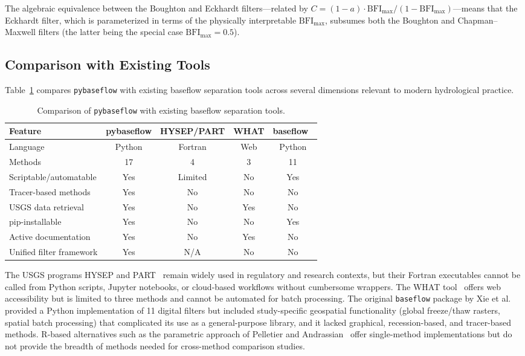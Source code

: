 \documentclass[hydrology,article,submit,pdftex,moreauthors]{Definitions/mdpi}
\begin{document}
The algebraic equivalence between the Boughton and Eckhardt filters---related by $C = (1-a)\cdot\mathrm{BFI_{max}}/(1-\mathrm{BFI_{max}})$---means that the Eckhardt filter, which is parameterized in terms of the physically interpretable $\mathrm{BFI_{max}}$, subsumes both the Boughton and Chapman--Maxwell filters (the latter being the special case $\mathrm{BFI_{max}} = 0.5$).

\subsection{Comparison with Existing Tools}
\label{sec:comparison_tools}

Table~\ref{tab:comparison} compares \texttt{pybaseflow} with existing baseflow separation tools across several dimensions relevant to modern hydrological practice.

\begin{table}[H]
\caption{Comparison of \texttt{pybaseflow} with existing baseflow separation tools.\label{tab:comparison}}
\small
\begin{tabularx}{\textwidth}{lcccc}
\toprule
\textbf{Feature} & \textbf{pybaseflow} & \textbf{HYSEP/PART} & \textbf{WHAT} & \textbf{baseflow}~\cite{Xie2020} \\
\midrule
Language & Python & Fortran & Web & Python \\
Methods & 17 & 4 & 3 & 11 \\
Scriptable/automatable & Yes & Limited & No & Yes \\
Tracer-based methods & Yes & No & No & No \\
USGS data retrieval & Yes & No & Yes & No \\
pip-installable & Yes & No & No & Yes \\
Active documentation & Yes & No & Yes & No \\
Unified filter framework & Yes & N/A & No & No \\
\bottomrule
\end{tabularx}
\end{table}

The USGS programs HYSEP and PART~\cite{Sloto1996,Rutledge1998} remain widely used in regulatory and research contexts, but their Fortran executables cannot be called from Python scripts, Jupyter notebooks, or cloud-based workflows without cumbersome wrappers. The WHAT tool~\cite{Lim2005} offers web accessibility but is limited to three methods and cannot be automated for batch processing. The original \texttt{baseflow} package by Xie et al.~\cite{Xie2020} provided a Python implementation of 11 digital filters but included study-specific geospatial functionality (global freeze/thaw rasters, spatial batch processing) that complicated its use as a general-purpose library, and it lacked graphical, recession-based, and tracer-based methods. R-based alternatives such as the parametric approach of Pelletier and Andrassian~\cite{Pelletier2020} offer single-method implementations but do not provide the breadth of methods needed for cross-method comparison studies.
\end{document}
